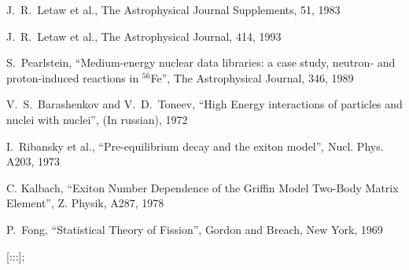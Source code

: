 \documentclass[twocolumn,twoside,slac]{revtex4}
\begin{document}
\begin{thebibliography}{9}
J.~R.~Letaw et al.,
The Astrophysical Journal Supplements, 51, 1983


J.~R.~Letaw et al.,
The Astrophysical Journal, 414, 1993


S.~Pearlstein,
``Medium-energy nuclear data libraries: a case study, neutron- and proton-induced reactions in $^{56}${F}e'',
The Astrophysical Journal, 346, 1989

V.~S.~Barashenkov and V.~D.~Toneev,
``High Energy interactions of particles and nuclei with nuclei'',
(In russian), 1972

I.~Ribansky et al.,
``Pre-equilibrium decay and the exiton model'',
Nucl. Phys. A203, 1973

C. Kalbach,
``Exiton Number Dependence of the Griffin Model Two-Body Matrix Element'',
Z. Physik, A287, 1978


P.~Fong,
``Statistical Theory of Fission'',
Gordon and Breach, New York, 1969

[:::];


\end{thebibliography}
\end{document}
